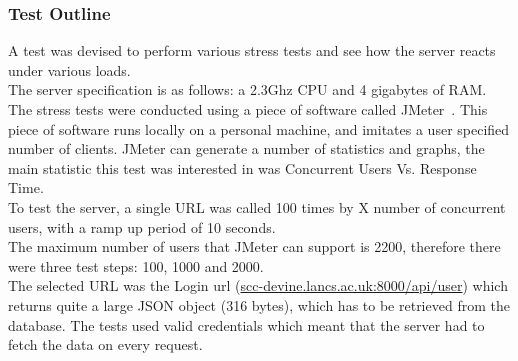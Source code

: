\documentclass[draft,preprint,12pt,3p]{elsarticle}
\begin{document}
\subsubsection{Test Outline}
A test was devised to perform various stress tests and see how the server reacts under various loads.\\
The server specification is as follows: a 2.3Ghz CPU and 4 gigabytes of RAM.\\
The stress tests were conducted using a piece of software called JMeter~\cite{jmeter}. This piece of software runs locally on a personal machine, and imitates a user specified number of clients. JMeter can generate a number of statistics and graphs, the main statistic this test was interested in was Concurrent Users Vs. Response Time.\\
To test the server, a single URL was called 100 times by X number of concurrent users, with a ramp up period of 10 seconds.\\
The maximum number of users that JMeter can support is 2200, therefore there were three test steps: 100, 1000 and 2000.\\
The selected URL was the Login url (\url{scc-devine.lancs.ac.uk:8000/api/user}) which returns quite a large JSON object (316 bytes), which has to be retrieved from the database. The tests used valid credentials which meant that the server had to fetch the data on every request.
\end{document}

